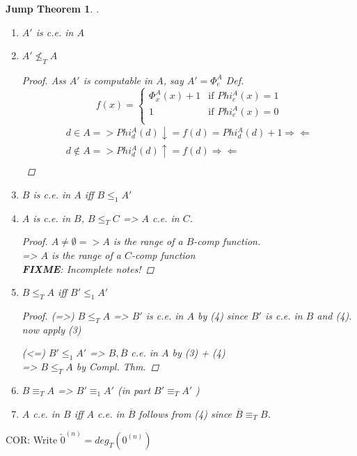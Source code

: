 \documentclass[12pt]{article}
\newcommand{\Conj}[1]{\ensuremath{\overline{#1}}}
\newcommand{\fixme}{\\ \textbf{FIXME}: Incomplete notes!}
\begin{document}
\newtheorem*{jmpthm}{Jump Theorem}
\begin{jmpthm}
 .
 \begin{enumerate}[(1)]
  \item $A'$ is c.e. in $A$
  \item $A' \not\le_T A$
\begin{proof}
 Ass $A'$ is computable in $A$, say $A' = \Phi^A_e$
 Def. \[
       f(x) = \begin{cases}
               \Phi^A_x(x)+1	&\text{if } Phi^A_e(x) = 1 \\ %
		1 		&\text{if } Phi^A_e(x) = 0 \\ %
              \end{cases}
       \]
\begin{align*}
 d \in A => Phi^A_d(d) \downarrow = f(d) = Phi^A_d(d) +1 \Rightarrow\Leftarrow \\ 
 d \not\in A => Phi^A_d(d) \uparrow = f(d) \Rightarrow\Leftarrow \\
\end{align*}			%
\end{proof}
  \item $B$ is c.e. in $A$ iff $B \le_1 A'$
  \item $A$ is c.e. in $B$, $B \le_T C$ => $A$ c.e. in $C$.
\begin{proof}
 $A \ne \emptyset => A$ is the range of a $B$-comp function. \\
=> $A$ is the range of a $C$-comp function
\fixme %
\end{proof}
  \item $B \le_T A$ iff $B' \le_1 A'$
\begin{proof}
 (=>) $B \le_T A$ => $B'$ is c.e. in $A$ by (4) since $B'$ is c.e. in $B$ and (4).
now apply (3)

 (<=) $B' \le_1 A'$ => $B, \Conj{B}$ c.e. in $A$ by (3) + (4) \\
  => $B \le_T A$ by Compl. Thm.
\end{proof}
  \item $B \equiv_T A$ => $B' \equiv_1 A'$	(in part $B' \equiv_T A'$ )
  \item $A$ c.e. in $B$ iff $A$ c.e. in $\Conj{B}$ 
	\proof follows from (4) since $\Conj{B} \equiv_T B$.


 \end{enumerate}
\end{jmpthm}

COR: Write $\utilde{0}^{(n)} = deg_T( 0^{(n)})$
\end{document}
